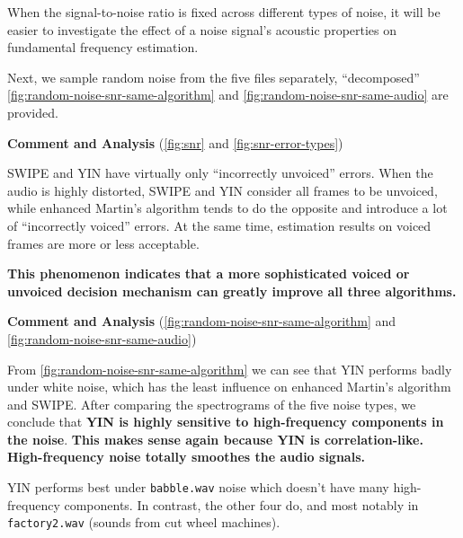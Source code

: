 \documentclass[11pt,a4paper]{report}
\begin{document}
When the signal-to-noise ratio is fixed across different types of noise, it will be easier to investigate the effect of a noise signal's acoustic properties on fundamental frequency estimation.

Next, we sample random noise from the five files separately, \enquote{decomposed} \autoref{fig:random-noise-snr-same-algorithm} and \autoref{fig:random-noise-snr-same-audio} are provided.

\begin{mdframed}
\textbf{Comment and Analysis} (\autoref{fig:snr} and \autoref{fig:snr-error-types})

\bigskip

SWIPE and YIN have virtually only \enquote{incorrectly unvoiced} errors.
When the audio is highly distorted, SWIPE and YIN consider all frames to be unvoiced, while enhanced Martin's algorithm tends to do the opposite and introduce a lot of \enquote{incorrectly voiced} errors.
At the same time, estimation results on voiced frames are more or less acceptable.

\textbf{This phenomenon indicates that a more sophisticated voiced or unvoiced decision mechanism can greatly improve all three algorithms.}
\end{mdframed}

\begin{mdframed}
\textbf{Comment and Analysis} (\autoref{fig:random-noise-snr-same-algorithm} and \autoref{fig:random-noise-snr-same-audio})

From \autoref{fig:random-noise-snr-same-algorithm} we can see that YIN performs badly under white noise, which has the least influence on enhanced Martin's algorithm and SWIPE\@.
After comparing the spectrograms of the five noise types, we conclude that \textbf{YIN is highly sensitive to high-frequency components in the noise}.
\textbf{This makes sense again because YIN is correlation-like.
High-frequency noise totally smoothes the audio signals.}

YIN performs best under \texttt{babble.wav} noise which doesn't have many high-frequency components.
In contrast, the other four do, and most notably in \texttt{factory2.wav} (sounds from cut wheel machines).
\end{mdframed}
\end{document}
